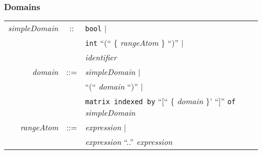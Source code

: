 \documentclass{article}
\begin{document}
\subsubsection{Domains}
\begin{tabular}{rcl}

\textit{simpleDomain} & :: & \texttt{bool} $\mid$ \\
                      &    & \texttt{int} ``(`` \{ \textit{rangeAtom} \} ``)'' $\mid$ \\
                      &    & \textit{identifier} \\
\textit{domain} & ::= &  \textit{simpleDomain} $\mid$ \\
                &     & ``(`` \textit{domain} ``)'' $\mid$ \\
                &     & \texttt{matrix indexed by} ``[`` \{
  \textit{domain} \}'  ``]'' \texttt{of} \textit{simpleDomain} \\ 
\textit{rangeAtom} & ::= & \textit{expression} $\mid$ \\
                   &     & \textit{expression} ``..'' \textit{expression} \\ 

\end{tabular}
\end{document}
